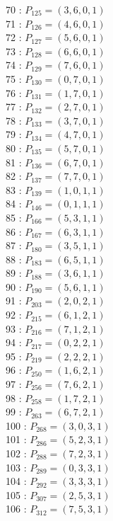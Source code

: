 \documentclass{article}
\begin{document}
{\begin{multicols}{3}
70 : $P_{125}=( 3, 6, 0, 1 )$\\
71 : $P_{126}=( 4, 6, 0, 1 )$\\
72 : $P_{127}=( 5, 6, 0, 1 )$\\
73 : $P_{128}=( 6, 6, 0, 1 )$\\
74 : $P_{129}=( 7, 6, 0, 1 )$\\
75 : $P_{130}=( 0, 7, 0, 1 )$\\
76 : $P_{131}=( 1, 7, 0, 1 )$\\
77 : $P_{132}=( 2, 7, 0, 1 )$\\
78 : $P_{133}=( 3, 7, 0, 1 )$\\
79 : $P_{134}=( 4, 7, 0, 1 )$\\
80 : $P_{135}=( 5, 7, 0, 1 )$\\
81 : $P_{136}=( 6, 7, 0, 1 )$\\
82 : $P_{137}=( 7, 7, 0, 1 )$\\
83 : $P_{139}=( 1, 0, 1, 1 )$\\
84 : $P_{146}=( 0, 1, 1, 1 )$\\
85 : $P_{166}=( 5, 3, 1, 1 )$\\
86 : $P_{167}=( 6, 3, 1, 1 )$\\
87 : $P_{180}=( 3, 5, 1, 1 )$\\
88 : $P_{183}=( 6, 5, 1, 1 )$\\
89 : $P_{188}=( 3, 6, 1, 1 )$\\
90 : $P_{190}=( 5, 6, 1, 1 )$\\
91 : $P_{203}=( 2, 0, 2, 1 )$\\
92 : $P_{215}=( 6, 1, 2, 1 )$\\
93 : $P_{216}=( 7, 1, 2, 1 )$\\
94 : $P_{217}=( 0, 2, 2, 1 )$\\
95 : $P_{219}=( 2, 2, 2, 1 )$\\
96 : $P_{250}=( 1, 6, 2, 1 )$\\
97 : $P_{256}=( 7, 6, 2, 1 )$\\
98 : $P_{258}=( 1, 7, 2, 1 )$\\
99 : $P_{263}=( 6, 7, 2, 1 )$\\
100 : $P_{268}=( 3, 0, 3, 1 )$\\
101 : $P_{286}=( 5, 2, 3, 1 )$\\
102 : $P_{288}=( 7, 2, 3, 1 )$\\
103 : $P_{289}=( 0, 3, 3, 1 )$\\
104 : $P_{292}=( 3, 3, 3, 1 )$\\
105 : $P_{307}=( 2, 5, 3, 1 )$\\
106 : $P_{312}=( 7, 5, 3, 1 )$\\

\end{multicols}}
\end{document}
